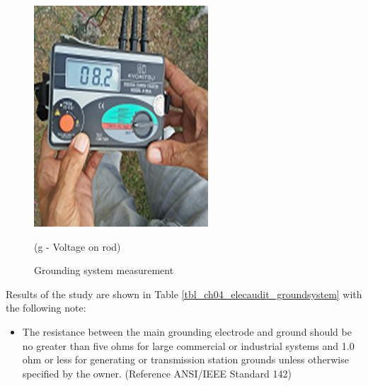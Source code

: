 \begin{figure}[!h]
\begin{minipage}[b]{0.3\linewidth}
	\includegraphics[width=\textwidth]{figures/fig_ch04_elecaudit_grounding_rod}
	\caption*{(g - Voltage on rod)}
\end{minipage}

	\caption{Grounding system measurement}
	\label{fig_ch04_elecaudit_groundingsystem}
\end{figure}

Results of the study are shown in Table \ref{tbl_ch04_elecaudit_groundsystem} with the following note:

\begin{itemize}
\item The resistance between the main grounding electrode and ground should be no greater than five ohms for large commercial or industrial systems and 1.0 ohm or less for generating or transmission station grounds unless otherwise specified by the owner. (Reference ANSI/IEEE Standard 142) 
\end{itemize}


